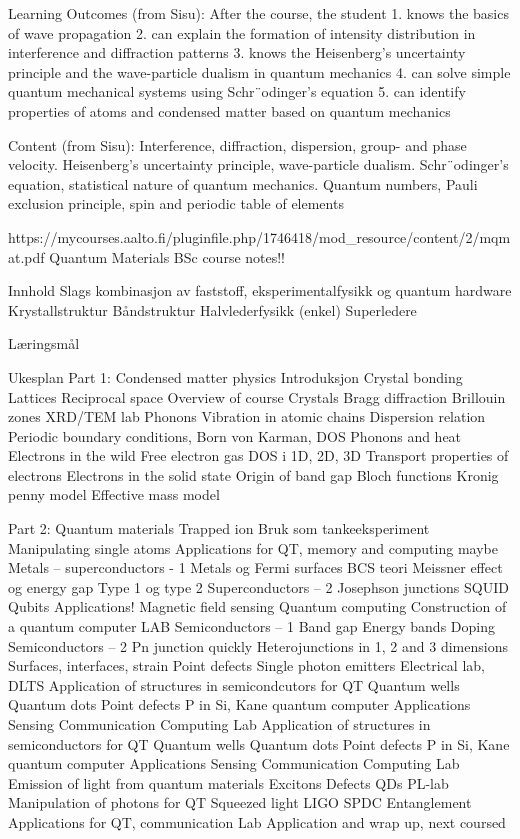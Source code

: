 \documentclass[%
oneside,                 %
final,                   %
10pt]{article}
\begin{document}
Learning Outcomes (from Sisu): After the course, the student 
1. knows the basics of wave propagation 
2. can explain the formation of intensity distribution in interference and diffraction patterns 
3. knows the Heisenberg’s uncertainty principle and the wave-particle dualism in quantum mechanics
4. can solve simple quantum mechanical systems using Schr¨odinger’s equation 
5. can identify properties of atoms and condensed matter based on quantum mechanics 

Content (from Sisu): Interference, diffraction, dispersion, group- and phase velocity. Heisenberg’s uncertainty principle, wave-particle dualism. Schr¨odinger’s equation, statistical nature of quantum mechanics. Quantum numbers, Pauli exclusion principle, spin and periodic table of elements

https://mycourses.aalto.fi/pluginfile.php/1746418/mod_resource/content/2/mqmat.pdf 
Quantum Materials BSc course notes!! 

Innhold
Slags kombinasjon av faststoff, eksperimentalfysikk og quantum hardware
Krystallstruktur 
Båndstruktur 
Halvlederfysikk (enkel) 
Superledere 

Læringsmål 

Ukesplan 
Part 1: Condensed matter physics 
Introduksjon 
Crystal bonding
Lattices  
Reciprocal space 
Overview of course 
Crystals 
Bragg diffraction 
Brillouin zones 
XRD/TEM lab 
Phonons 
Vibration in atomic chains 
Dispersion relation 
Periodic boundary conditions, Born von Karman, DOS 
Phonons and heat 
Electrons in the wild 
Free electron gas 
DOS i 1D, 2D, 3D 
Transport properties of electrons 
Electrons in the solid state  
Origin of band gap 
Bloch functions 
Kronig penny model
Effective mass model  

Part 2: Quantum materials 
Trapped ion 
Bruk som tankeeksperiment
Manipulating single atoms 
Applications for QT, memory and computing maybe
Metals – superconductors  - 1 
Metals og Fermi surfaces 
BCS teori 
Meissner effect og energy gap 
Type 1 og type 2 
Superconductors – 2 
Josephson junctions 
SQUID 
Qubits 
Applications!
Magnetic field sensing 
Quantum computing
Construction of a quantum computer 
LAB 
Semiconductors – 1 
Band gap
Energy bands 
Doping 
Semiconductors – 2  
Pn junction quickly 
Heterojunctions in 1, 2 and 3 dimensions 
Surfaces, interfaces, strain 
Point defects 
Single photon emitters 
Electrical lab, DLTS 
Application of structures in semicondcutors for QT 
Quantum wells
Quantum dots
Point defects 
P in Si, Kane quantum computer 
Applications 
Sensing
Communication
Computing 
Lab
Application of structures in semiconductors for QT 
Quantum wells
Quantum dots
Point defects 
P in Si, Kane quantum computer 
Applications 
Sensing
Communication
Computing 
Lab
Emission of light from quantum materials
Excitons 
Defects
QDs
PL-lab  
Manipulation of photons for QT 
Squeezed light
LIGO 
SPDC 
Entanglement 
Applications for QT, communication 
Lab  
Application and wrap up, next coursed 
\end{document}
